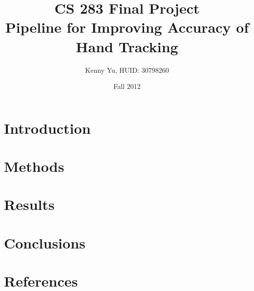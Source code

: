 \documentclass[12pt]{article}
\begin{document}
\title{CS 283 Final Project \\ Pipeline for Improving Accuracy of Hand Tracking}
\date{Fall 2012}
\author{Kenny Yu, HUID: 30798260}

\maketitle

\section{Introduction}

\section{Methods}

\section{Results}

\section{Conclusions}

\section{References}
\end{document}
